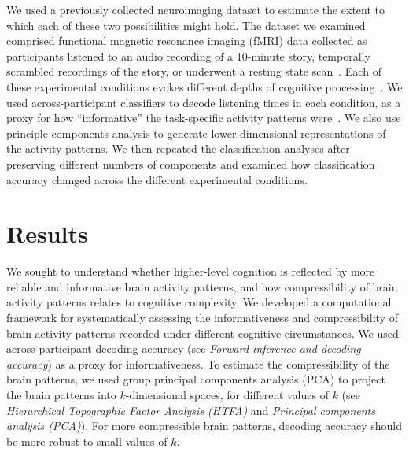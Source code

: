 \documentclass[english, 11pt]{article}
\begin{document}
We used a previously collected neuroimaging dataset to estimate the extent to
which each of these two possibilities might hold. The dataset we examined
comprised functional magnetic resonance imaging (fMRI) data collected as
participants listened to an audio recording of a 10-minute story, temporally
scrambled recordings of the story, or underwent a resting state
scan~\citep{SimoEtal16}. Each of these experimental conditions evokes different
depths of cognitive processing~\citep{SimoEtal16,LernEtal11,
HassEtal08,OwenEtal21}. We used across-participant classifiers to decode
listening times in each condition, as a proxy for how ``informative'' the
task-specific activity patterns were~\citep{SimoChan20}. We also use principle
components analysis to generate lower-dimensional representations of the
activity patterns. We then repeated the classification analyses after
preserving different numbers of components and examined how classification
accuracy changed across the different experimental conditions.



\section*{Results}

We sought to understand whether higher-level cognition is reflected by more
reliable and informative brain activity patterns, and how compressibility of
brain activity patterns relates to cognitive complexity. We developed a
computational framework for systematically assessing the informativeness and
compressibility of brain activity patterns recorded under different cognitive
circumstances. We used across-participant decoding accuracy (see
\textit{Forward inference and decoding accuracy}) as a proxy for
informativeness. To estimate the compressibility of the brain patterns, we used
group principal components analysis (PCA) to project the brain patterns into
$k$-dimensional spaces, for different values of $k$ (see \textit{Hierarchical
Topographic Factor Analysis (HTFA)} and \textit{Principal components analysis
(PCA)}). For more compressible brain patterns, decoding accuracy should be more
robust to small values of $k$.
\end{document}
